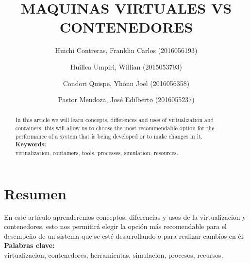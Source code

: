 \documentclass[preprint,12pt]{elsarticle}
\begin{document}
	
	\begin{frontmatter} 

		\title{\huge MAQUINAS VIRTUALES VS CONTENEDORES}
		
		\author{Huichi Contreras, Franklin Carlos            (2016056193)}
		\author{Huillca Umpiri, Willian              		  (2015053793)}
		\author{Condori Quispe, Yhónn Joel	         	   (2016056358)} 
		\author{Pastor Mendoza, José Edilberto              (2016055237)} 
		\address{Escuela Profesional de Ingeniería de Sistemas}
		\address{Universidad Privada de Tacna}
		\address{Tacna, Perú}
		

		\begin{abstract}
In this article we will learn concepts, differences and uses of virtualization and containers, this will allow us to choose the most recommendable option for the performance of a system that is being developed or to make changes in it.\\
\textbf{Keywords:}  \\
 virtualization, containers, tools, processes, simulation, resources.\\

		\end{abstract}


	\end{frontmatter}


\section{Resumen}


En este artículo aprenderemos conceptos, diferencias y usos de la virtualizacion y contenedores, esto nos permitirá elegir la opción más recomendable para el desempeño de un sistema que se esté desarrollando o para realizar cambios en él.\\

\textbf{Palabras clave:}   \\
virtualizacion, contenedores, herramientas, simulacion, procesos, recursos.\\
\end{document}
